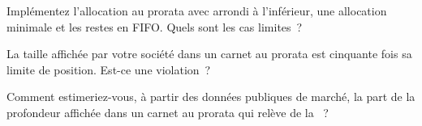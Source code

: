 \begin{interviewq}\label{iq:hf:futures-market-making:4}
Implémentez l'allocation au prorata avec arrondi à l'inférieur, une allocation minimale et les restes en FIFO. Quels sont les cas limites~?
\end{interviewq}

\begin{interviewq}\label{iq:hf:futures-market-making:5}
La taille affichée par votre société dans un carnet au prorata est cinquante fois sa limite de position. Est-ce une violation~?
\end{interviewq}

\begin{interviewq}\label{iq:hf:futures-market-making:6}
Comment estimeriez-vous, à partir des données publiques de marché, la part de la profondeur affichée dans un carnet au prorata qui relève de la ~?
\end{interviewq}
